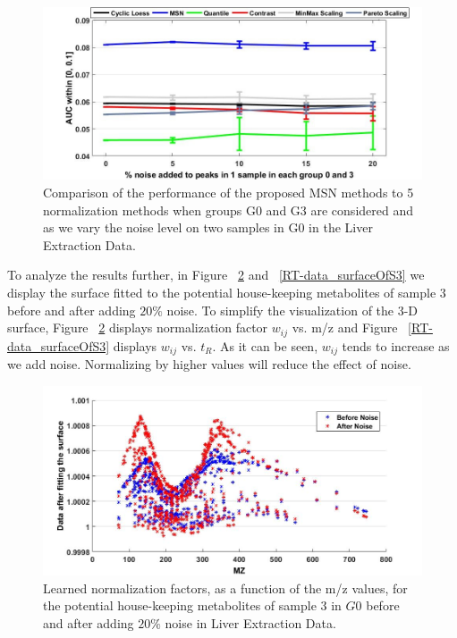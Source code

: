 \begin{figure}
	
	\centering
	\includegraphics[width=1\textwidth]{ErrorBar_PLSDA_2samplesingroup0-3}
	\caption{Comparison of the performance of the proposed MSN methods to 5 normalization methods when groups G0 and G3 are considered and as we vary the noise level on two samples in G0 in the Liver Extraction Data.}
	\label{ErrorBar_PLSDA_2samplesingroup0-3}
\end{figure}

To analyze the results further, in Figure ~\ref{MZ-data_surfaceOfS3} and ~\ref{RT-data_surfaceOfS3} we display the surface fitted to the potential house-keeping metabolites of sample 3 before and after adding $20\%$ noise. To simplify the visualization of the 3-D surface, Figure ~\ref{MZ-data_surfaceOfS3} displays normalization factor $w_{ij}$ vs. m/z and Figure ~\ref{RT-data_surfaceOfS3} displays $w_{ij}$  vs.  $t_R$. As it can be seen, $w_{ij}$  tends to increase as we add noise. Normalizing by higher values will reduce the effect of noise. 



\begin{figure}
	
	\centering
	\includegraphics[width=1\textwidth]{MZ-data_surfaceOfS3}
	\caption{Learned normalization factors, as a function of the m/z values, for the potential house-keeping metabolites of sample 3 in $G0$ before and after adding $20\%$ noise in Liver Extraction Data.}
	\label{MZ-data_surfaceOfS3}
\end{figure}

